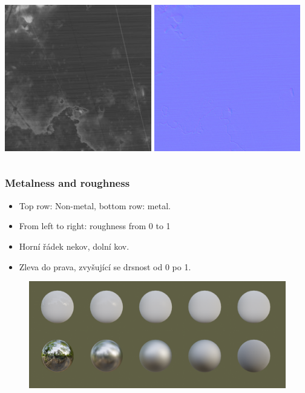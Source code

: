 \begin{frame}
\begin{columns}[c]
    \includegraphics[width=0.48\textwidth]{pics/physicallyBasedRendering/metal/roughness}
    \includegraphics[width=0.48\textwidth]{pics/physicallyBasedRendering/metal/normal}
  \end{columns}
\end{frame}

\begin{frame}\frametitle{Metalness and roughness}
  \scriptsize
  \begin{itemize}
    \item Top row: Non-metal, bottom row: metal.
    \item From left to right: roughness from 0 to 1
  \end{itemize}
  \begin{itemize}
    \item Horní řádek nekov, dolní kov.
    \item Zleva do prava, zvyšující se drsnost od 0 po 1. 
  \end{itemize}
  \begin{figure}[ht]
    \includegraphics[width=\textwidth]{pics/physicallyBasedRendering/metal/roughness_metalness}
  \end{figure}
\end{frame}

